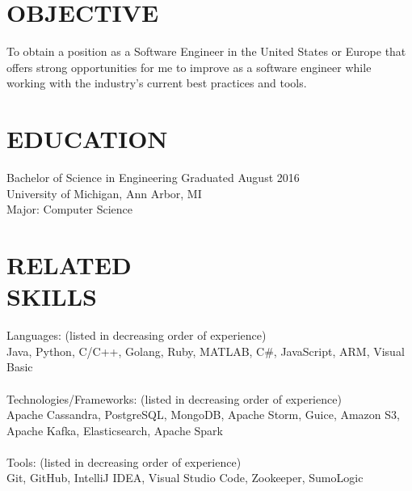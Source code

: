 \documentclass[line,margin]{res}
\begin{document}

\color{HeaderColor}
\address{\hfill riizade@gmail.com -- github.com/riizade -- 248-716-5054}
\address{255 King St, Unit 317, San Francisco, CA, 94107}

 
 \renewcommand{\labelitemi}{$-$}
 
\begin{resume}
\color{black}
\section{\textcolor{HeaderColor}{OBJECTIVE}}
				To obtain a position as a Software Engineer in the United States or Europe that offers strong opportunities for me to improve as a software engineer while working with the industry's current best practices and tools.

\section{\textcolor{HeaderColor}{EDUCATION}} {\sc Bachelor of Science in Engineering} \hfill Graduated August 2016\\
				University of Michigan, Ann Arbor, MI \\
                Major: Computer Science 
 
\section{\textcolor{HeaderColor}{RELATED \\ SKILLS}} 
				{\sc Languages: (listed in decreasing order of experience)} \\
				Java, Python, C/C++, Golang, Ruby, MATLAB, C\#, JavaScript, ARM, Visual Basic \\
\\
				{\sc Technologies/Frameworks: (listed in decreasing order of experience)} \\
				Apache Cassandra, PostgreSQL, MongoDB, Apache Storm, Guice, Amazon S3,\\ Apache Kafka, Elasticsearch, Apache Spark
\\ \\
				{\sc Tools: (listed in decreasing order of experience)} \\
				Git, GitHub, IntelliJ IDEA, Visual Studio Code, Zookeeper, SumoLogic \\
 

\end{resume}
\end{document}
